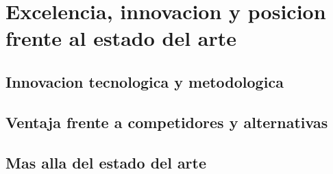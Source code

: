 \section{Excelencia, innovacion y posicion frente al estado del arte}

\subsection{Innovacion tecnologica y metodologica}

\subsection{Ventaja frente a competidores y alternativas}

\subsection{Mas alla del estado del arte}
